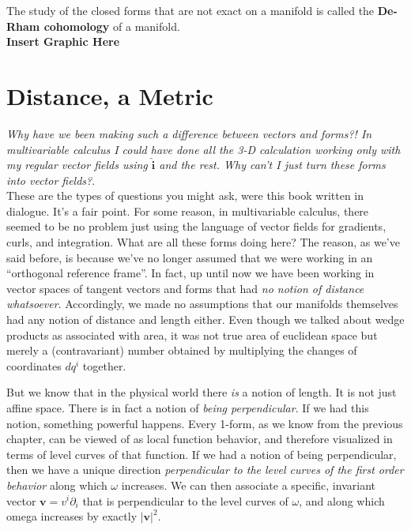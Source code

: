 	The study of the closed forms that are not exact on a manifold is called the \textbf{De-Rham cohomology} of a manifold. \\
	
	\textbf{Insert Graphic Here}
	
	
	\section{Distance, a Metric}	
	
	
	\emph{Why have we been making such a difference between vectors and forms?! In multivariable calculus I could have done all the 3-D calculation working only with my regular vector fields using $\hat{\mathbf{i}}$ and the rest. Why can't I just turn these forms into vector fields?}.\\
	
	These are the types of questions you might ask, were this book written in dialogue. It's a fair point. For some reason, in multivariable calculus, there seemed to be no problem just using the language of vector fields for gradients, curls, and integration. What are all these forms doing here? The reason, as we've said before, is because we've no longer assumed that we were working in an ``orthogonal reference frame''. In fact, up until now we have been working in vector spaces of tangent vectors and forms that had \emph{no notion of distance whatsoever}. Accordingly, we made no assumptions that our manifolds themselves had any notion of distance and length either. Even though we talked about wedge products as associated with area, it was not true area of euclidean space but merely a (contravariant) number obtained by multiplying the changes of coordinates $dq^i$ together. 
	
	
	But we know that in the physical world there \emph{is} a notion of length. It is not just affine space. There is in fact a notion of \emph{being perpendicular}. If we had this notion, something powerful happens. Every 1-form, as we know from the previous chapter, can be viewed of as local function behavior, and therefore visualized in terms of level curves of that function. If we had a notion of being perpendicular, then we have a unique direction \emph{perpendicular to the level curves of the first order behavior} along which $\omega$ increases. We can then associate a specific, invariant vector $\mathbf v = v^i \partial_i$ that is perpendicular to the level curves of $\omega$, and along which omega increases by exactly $|\mathbf v|^2$. 
	
